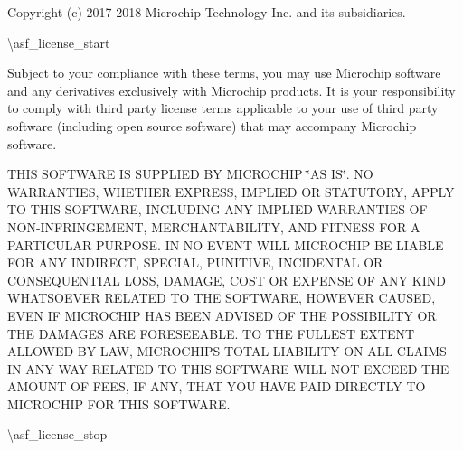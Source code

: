 Copyright (c) 2017-\/2018 Microchip Technology Inc. and its subsidiaries.

\textbackslash{}asf\+\_\+license\+\_\+start

Subject to your compliance with these terms, you may use Microchip software and any derivatives exclusively with Microchip products. It is your responsibility to comply with third party license terms applicable to your use of third party software (including open source software) that may accompany Microchip software.

THIS SOFTWARE IS SUPPLIED BY MICROCHIP \char`\"{}\+AS IS\char`\"{}. NO WARRANTIES, WHETHER EXPRESS, IMPLIED OR STATUTORY, APPLY TO THIS SOFTWARE, INCLUDING ANY IMPLIED WARRANTIES OF NON-\/\+INFRINGEMENT, MERCHANTABILITY, AND FITNESS FOR A PARTICULAR PURPOSE. IN NO EVENT WILL MICROCHIP BE LIABLE FOR ANY INDIRECT, SPECIAL, PUNITIVE, INCIDENTAL OR CONSEQUENTIAL LOSS, DAMAGE, COST OR EXPENSE OF ANY KIND WHATSOEVER RELATED TO THE SOFTWARE, HOWEVER CAUSED, EVEN IF MICROCHIP HAS BEEN ADVISED OF THE POSSIBILITY OR THE DAMAGES ARE FORESEEABLE. TO THE FULLEST EXTENT ALLOWED BY LAW, MICROCHIP\textquotesingle{}S TOTAL LIABILITY ON ALL CLAIMS IN ANY WAY RELATED TO THIS SOFTWARE WILL NOT EXCEED THE AMOUNT OF FEES, IF ANY, THAT YOU HAVE PAID DIRECTLY TO MICROCHIP FOR THIS SOFTWARE.

\textbackslash{}asf\+\_\+license\+\_\+stop 